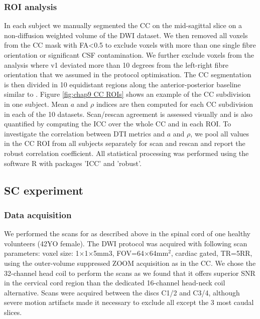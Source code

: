 \subsubsection*{ROI analysis} 
In each subject we manually segmented the \gls{CC} on the mid-sagittal slice on a non-diffusion weighted volume of the \gls{DWI} dataset. We then removed all voxels from the \gls{CC} mask with FA<0.5 to exclude voxels with more than one single fibre orientation or significant CSF contamination. We further exclude voxels from the analysis where v1 deviated more than 10 degrees from the left-right fibre orientation that we assumed in the protocol optimisation. The \gls{CC} segmentation is then divided in 10 equidistant regions along the anterior-posterior baseline similar to \cite{Aboitiz:1992}. Figure \ref{fig:chap9 CC ROIs} shows an example of the \gls{CC} subdivision in one subject. Mean $a$ and $\rho$ indices are then computed for each \gls{CC} subdivision in each of the 10 datasets. Scan/rescan agreement is assessed visually and is also quantified by computing the \gls{ICC} \citep{Shrout:1979} over the whole \gls{CC} and in each \gls{ROI}. To investigate the correlation between DTI metrics and $a$ and $\rho$, we pool all values in the \gls{CC} \gls{ROI} from all subjects separately for scan and rescan and report the robust correlation coefficient\citep{Huber:1996}. All statistical processing was performed using the software R\citep{RCoreTeam:2012} with packages 'ICC'\citep{Wolak:2011} and 'robust'\citep{Wang:2012}.

\subsection{SC experiment}
\subsubsection*{Data acquisition}
We performed the scans for \SFasym{} as described above in the spinal cord of one healthy volunteers (42YO female). The \SF{} DWI protocol was acquired with following scan parameters: voxel size: 1$\times$1$\times$5mm3, FOV=64$\times$64mm$^2$, cardiac gated, TR=5RR, using the outer-volume suppressed ZOOM acquisition \citep{Wilm:2007} as in the \gls{CC}. We chose the 32-channel head coil to perform the scans as we found that it offers superior \gls{SNR} in the cervical cord region than the dedicated 16-channel head-neck coil alternative. Scans were acquired between the discs C1/2 and C3/4, although severe motion artifacts made it necessary to exclude all except the 3 most caudal slices. 

